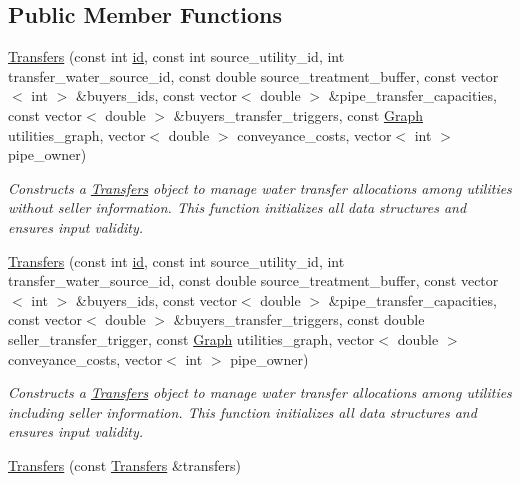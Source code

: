 \subsection*{Public Member Functions}
\begin{DoxyCompactItemize}
\item 
\mbox{\hyperlink{classTransfers_a40555bc28e085d0e119a9f039317c79f}{Transfers}} (const int \mbox{\hyperlink{classDroughtMitigationPolicy_abf3ed19ed98e0d74dc9ae24094be640b}{id}}, const int source\+\_\+utility\+\_\+id, int transfer\+\_\+water\+\_\+source\+\_\+id, const double source\+\_\+treatment\+\_\+buffer, const vector$<$ int $>$ \&buyers\+\_\+ids, const vector$<$ double $>$ \&pipe\+\_\+transfer\+\_\+capacities, const vector$<$ double $>$ \&buyers\+\_\+transfer\+\_\+triggers, const \mbox{\hyperlink{classGraph}{Graph}} utilities\+\_\+graph, vector$<$ double $>$ conveyance\+\_\+costs, vector$<$ int $>$ pipe\+\_\+owner)
\begin{DoxyCompactList}\small\item\em Constructs a \mbox{\hyperlink{classTransfers}{Transfers}} object to manage water transfer allocations among utilities without seller information. This function initializes all data structures and ensures input validity. \end{DoxyCompactList}\item 
\mbox{\hyperlink{classTransfers_ae6abf817349382b66abc9cc3f45193a1}{Transfers}} (const int \mbox{\hyperlink{classDroughtMitigationPolicy_abf3ed19ed98e0d74dc9ae24094be640b}{id}}, const int source\+\_\+utility\+\_\+id, int transfer\+\_\+water\+\_\+source\+\_\+id, const double source\+\_\+treatment\+\_\+buffer, const vector$<$ int $>$ \&buyers\+\_\+ids, const vector$<$ double $>$ \&pipe\+\_\+transfer\+\_\+capacities, const vector$<$ double $>$ \&buyers\+\_\+transfer\+\_\+triggers, const double seller\+\_\+transfer\+\_\+trigger, const \mbox{\hyperlink{classGraph}{Graph}} utilities\+\_\+graph, vector$<$ double $>$ conveyance\+\_\+costs, vector$<$ int $>$ pipe\+\_\+owner)
\begin{DoxyCompactList}\small\item\em Constructs a \mbox{\hyperlink{classTransfers}{Transfers}} object to manage water transfer allocations among utilities including seller information. This function initializes all data structures and ensures input validity. \end{DoxyCompactList}\item 
\mbox{\hyperlink{classTransfers_af88f7908692240eec9f3179128c6f343}{Transfers}} (const \mbox{\hyperlink{classTransfers}{Transfers}} \&transfers)

\end{DoxyCompactItemize}
